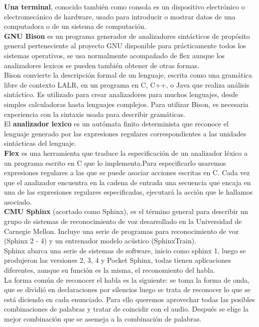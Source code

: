 \documentclass{article}
\begin{document}
{\bf Una terminal}, conocido también como consola es un dispositivo electrónico o electromecánico de hardware, usado para introducir o mostrar datos de una computadora o de un sistema de computación.\\

{\bf GNU Bison} es un programa generador de analizadores sintácticos de propósito general perteneciente al proyecto GNU disponible para prácticamente todos los sistemas operativos, se usa normalmente acompañado de flex aunque los analizadores lexicos se pueden también obtener de otras formas.\\
Bison convierte la descripción formal de un lenguaje, escrita como una gramática libre de contexto LALR, en un programa en C, C++, o Java que realiza análisis sintáctico. Es utilizado para crear analizadores para muchos lenguajes, desde simples calculadoras hasta lenguajes complejos. Para utilizar Bison, es necesaria experiencia con la sintaxis usada para describir gramáticas.\\

El {\bf analizador lexico} es un autómata finito determinista que reconoce el lenguaje generado por las expresiones regulares correspondientes a las unidades sintácticas del lenguaje.\\
{\bf Flex} es una herramienta que traduce la especificación de un analizador léxico a un programa escrito en C que lo implementa.Para especificarlo usaremos expresiones regulares a las que se puede asociar acciones escritas en C. Cada vez que el analizador encuentra en la cadena de entrada una secuencia que encaja en una de las expresiones regulares especificadas, ejecutará la acción que le hallamos asociado.\\

{\bf CMU Sphinx} (acortado como Sphinx), es el término general para describir un grupo de sistemas de reconocimiento de voz desarrollado en la Universidad de Carnegie Mellon. Incluye una serie de programas para reconocimiento de voz (Sphinx 2 - 4) y un entrenador modelo acústico (SphinxTrain).\\
Sphinx abarca una serie de sistemas de software, inicio como sphinx 1, luego se produjeron las versiones 2, 3, 4 y Pocket Sphinx, todas tienen aplicaciones diferentes, aunque su función es la misma, el reconomiento del habla.\\
La forma común de reconocer el habla es la siguiente: se toma la forma de onda, que se dividió en declaraciones por silencios luego se trata de reconocer lo que se está diciendo en cada enunciado. Para ello queremos aprovechar todas las posibles combinaciones de palabras y tratar de coincidir con el audio. Después se elige la mejor combinación que se asemeja a la combinación de palabras.\\
\end{document}
